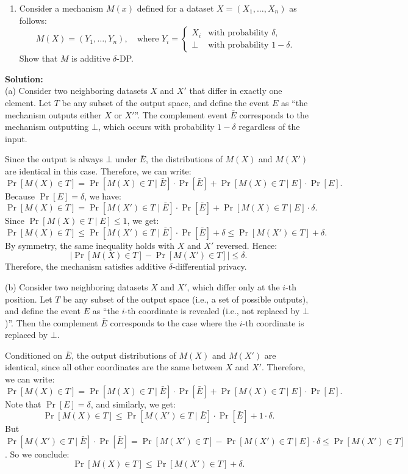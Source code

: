 \documentclass[12pt]{article}
\begin{document}
\begin{enumerate}
\begin{enumerate}
\item  Consider a mechanism $M(x)$ defined for a dataset $X = (X_1, \dots, X_n)$ as follows:
\[
M(X) = (Y_1, \dots, Y_n), \quad \text{where } Y_i = \begin{cases} 
X_i & \text{with probability } \delta, \\
\perp & \text{with probability } 1-\delta.
\end{cases}
\]
Show that $M$ is additive $\delta$-DP.
\end{enumerate}
\begin{solution}
{\bf Solution:}\\
(a)
Consider two neighboring datasets $X$ and $X'$ that differ in exactly one element. Let $T$ be any subset of the output space, and define the event $E$ as ``the mechanism outputs either $X$ or $X'$''. The complement event $\bar{E}$ corresponds to the mechanism outputting $\bot$, which occurs with probability $1 - \delta$ regardless of the input.

Since the output is always $\bot$ under $\bar{E}$, the distributions of $M(X)$ and $M(X')$ are identical in this case. Therefore, we can write:
\[
\Pr[M(X) \in T] = \Pr[M(X) \in T \mid \bar{E}] \cdot \Pr[\bar{E}] + \Pr[M(X) \in T \mid E] \cdot \Pr[E].
\]
Because $\Pr[E] = \delta$, we have:
\[
\Pr[M(X) \in T] = \Pr[M(X') \in T \mid \bar{E}] \cdot \Pr[\bar{E}] + \Pr[M(X) \in T \mid E] \cdot \delta.
\]
Since $\Pr[M(X) \in T \mid E] \leq 1$, we get:
\[
\Pr[M(X) \in T] \leq \Pr[M(X') \in T \mid \bar{E}] \cdot \Pr[\bar{E}] + \delta \leq \Pr[M(X') \in T] + \delta.
\]
By symmetry, the same inequality holds with $X$ and $X'$ reversed. Hence:
\[
\left| \Pr[M(X) \in T] - \Pr[M(X') \in T] \right| \leq \delta.
\]
Therefore, the mechanism satisfies additive $\delta$-differential privacy.

(b)
Consider two neighboring datasets $X$ and $X'$, which differ only at the $i$-th position. Let $T$ be any subset of the output space (i.e., a set of possible outputs), and define the event $E$ as ``the $i$-th coordinate is revealed (i.e., not replaced by $\bot$)''. Then the complement $\bar{E}$ corresponds to the case where the $i$-th coordinate is replaced by $\bot$.

Conditioned on $\bar{E}$, the output distributions of $M(X)$ and $M(X')$ are identical, since all other coordinates are the same between $X$ and $X'$. Therefore, we can write:
\[
\Pr[M(X) \in T] = \Pr[M(X) \in T \mid \bar{E}] \cdot \Pr[\bar{E}] + \Pr[M(X) \in T \mid E] \cdot \Pr[E].
\]
Note that $\Pr[E] = \delta$, and similarly, we get:
\[
\Pr[M(X) \in T] \leq \Pr[M(X') \in T \mid \bar{E}] \cdot \Pr[\bar{E}] + 1 \cdot \delta.
\]
But $\Pr[M(X') \in T \mid \bar{E}] \cdot \Pr[\bar{E}] = \Pr[M(X') \in T] - \Pr[M(X') \in T \mid E] \cdot \delta \leq \Pr[M(X') \in T]$. So we conclude:
\[
\Pr[M(X) \in T] \leq \Pr[M(X') \in T] + \delta.
\]


\end{solution}
\end{enumerate}
\end{document}
